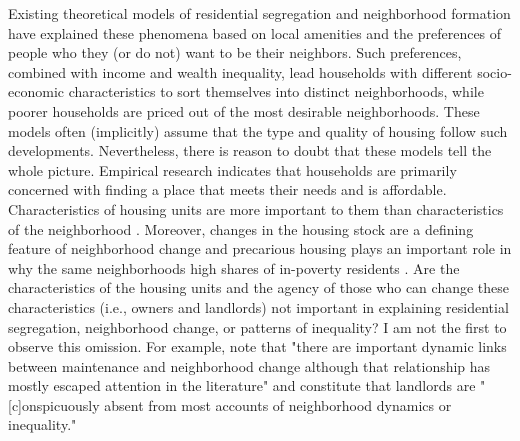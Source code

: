 Existing theoretical models of residential segregation and neighborhood formation have explained these phenomena based on local amenities and the preferences of people who they (or do not) want to be their neighbors. Such preferences, combined with income and wealth inequality, lead households with different socio-economic characteristics to sort themselves into distinct neighborhoods, while poorer households are priced out of the most desirable neighborhoods. These models often (implicitly) assume that the type and quality of housing follow such developments. Nevertheless, there is reason to doubt that these models tell the whole picture. Empirical research indicates that households are primarily concerned with finding a place that meets their needs and is affordable. Characteristics of housing units are more important to them than characteristics of the neighborhood \citep{chauCriticalReviewLiterature2003, bayerEquilibriumModelSorting2004, mummoloWhyPartisansNot2017, delucaNotJustLateral2020}. Moreover, changes in the housing stock are a defining feature of neighborhood change \citep{redfernWhatMakesGentrification2003} and precarious housing plays an important role in why the same neighborhoods high shares of in-poverty residents \citep{pendallWhyHighPovertyNeighborhoods2016}. Are the characteristics of the housing units and the agency of those who can change these characteristics (i.e., owners and landlords) not important in explaining residential segregation, neighborhood change, or patterns of inequality? I am not the first to observe this omission. For example, \citet[1081]{rosenthalChangePersistenceEconomic2015} note that "there are important dynamic links between maintenance and neighborhood change although that relationship has mostly escaped attention in the literature" and \citet[1093]{desmondPoorPayMore2019} constitute that landlords are "[c]onspicuously absent from most accounts of neighborhood dynamics or inequality."

